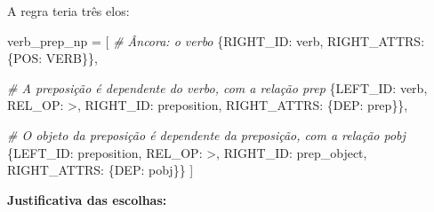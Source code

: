 \documentclass[
  brazilian,
]{article}
\newenvironment{Shaded}{}{}
\newcommand{\CommentTok}[1]{\textcolor[rgb]{0.38,0.63,0.69}{\textit{#1}}}
\newcommand{\NormalTok}[1]{#1}
\newcommand{\OperatorTok}[1]{\textcolor[rgb]{0.40,0.40,0.40}{#1}}
\newcommand{\StringTok}[1]{\textcolor[rgb]{0.25,0.44,0.63}{#1}}
\begin{document}
A regra teria três elos:

\begin{Shaded}
\begin{Highlighting}[]
\NormalTok{verb\_prep\_np }\OperatorTok{=}\NormalTok{ [}
    \CommentTok{\# Âncora: o verbo}
\NormalTok{    \{}\StringTok{\textquotesingle{}RIGHT\_ID\textquotesingle{}}\NormalTok{: }\StringTok{\textquotesingle{}verb\textquotesingle{}}\NormalTok{, }\StringTok{\textquotesingle{}RIGHT\_ATTRS\textquotesingle{}}\NormalTok{: \{}\StringTok{\textquotesingle{}POS\textquotesingle{}}\NormalTok{: }\StringTok{\textquotesingle{}VERB\textquotesingle{}}\NormalTok{\}\},}

    \CommentTok{\# A preposição é dependente do verbo, com a relação \textquotesingle{}prep\textquotesingle{}}
\NormalTok{    \{}\StringTok{\textquotesingle{}LEFT\_ID\textquotesingle{}}\NormalTok{: }\StringTok{\textquotesingle{}verb\textquotesingle{}}\NormalTok{, }\StringTok{\textquotesingle{}REL\_OP\textquotesingle{}}\NormalTok{: }\StringTok{\textquotesingle{}\textgreater{}\textquotesingle{}}\NormalTok{, }\StringTok{\textquotesingle{}RIGHT\_ID\textquotesingle{}}\NormalTok{: }\StringTok{\textquotesingle{}preposition\textquotesingle{}}\NormalTok{,}
     \StringTok{\textquotesingle{}RIGHT\_ATTRS\textquotesingle{}}\NormalTok{: \{}\StringTok{\textquotesingle{}DEP\textquotesingle{}}\NormalTok{: }\StringTok{\textquotesingle{}prep\textquotesingle{}}\NormalTok{\}\},}

    \CommentTok{\# O objeto da preposição é dependente da preposição, com a relação \textquotesingle{}pobj\textquotesingle{}}
\NormalTok{    \{}\StringTok{\textquotesingle{}LEFT\_ID\textquotesingle{}}\NormalTok{: }\StringTok{\textquotesingle{}preposition\textquotesingle{}}\NormalTok{, }\StringTok{\textquotesingle{}REL\_OP\textquotesingle{}}\NormalTok{: }\StringTok{\textquotesingle{}\textgreater{}\textquotesingle{}}\NormalTok{, }\StringTok{\textquotesingle{}RIGHT\_ID\textquotesingle{}}\NormalTok{: }\StringTok{\textquotesingle{}prep\_object\textquotesingle{}}\NormalTok{,}
     \StringTok{\textquotesingle{}RIGHT\_ATTRS\textquotesingle{}}\NormalTok{: \{}\StringTok{\textquotesingle{}DEP\textquotesingle{}}\NormalTok{: }\StringTok{\textquotesingle{}pobj\textquotesingle{}}\NormalTok{\}\}}
\NormalTok{]}
\end{Highlighting}
\end{Shaded}

\textbf{Justificativa das escolhas:}
\end{document}
